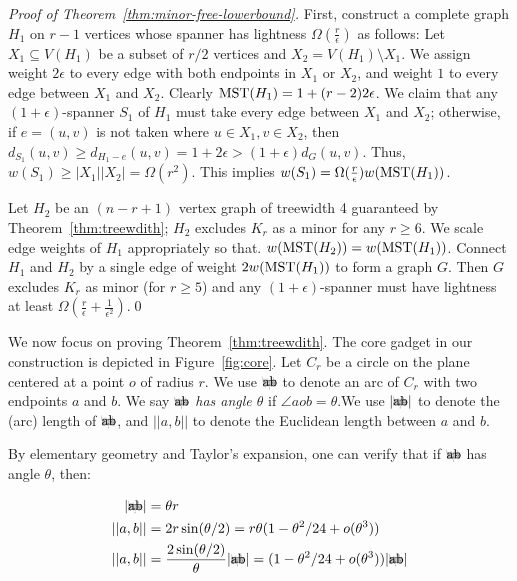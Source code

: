 \begin{proof}[Proof of Theorem~\ref{thm:minor-free-lowerbound}]
	First, construct a complete graph $H_1$ on $r-1$ vertices whose spanner has lightness $\Omega(\frac{r}{\epsilon})$ as follows: Let $X_1\subseteq V(H_1)$ be a subset of $r/2$ vertices and $X_2 = V(H_1)\setminus X_1$. We assign weight $2\epsilon$ to every edge with both endpoints in $X_1$ or $X_2$, and weight $1$ to every edge between $X_1$ and $X_2$. Clearly $\mathrm{MST}(H_1)  = 1 + (r-2)2\epsilon$. We claim that any $(1+\epsilon)$-spanner $S_1$ of $H_1$ must take every edge between $X_1$ and $X_2$; otherwise, if $e = (u,v)$ is not taken where $u\in X_1,v\in X_2$, then $d_{S_1}(u,v) \geq d_{H_1 - e}(u,v)=1+2\epsilon > (1+\epsilon)d_G(u,v)$. Thus, $w(S_1)\geq |X_1||X_2| = \Omega(r^2)$. This implies $w(S_1) = \Omega(\frac{r}{\epsilon})w(\mathrm{MST}(H_1))$.
	
	
	Let $H_2$ be an $(n-r+1)$ vertex graph of treewidth 4 guaranteed by Theorem~\ref{thm:treewdith}; $H_2$ excludes $K_r$ as a minor for any $r\geq 6$. We scale edge weights of $H_1$ appropriately so that. $w(\mathrm{MST}(H_2)) = w(\mathrm{MST}(H_1))$.  Connect $H_1$ and $H_2$ by a single edge of weight $2w(\mathrm{MST}(H_1))$ to form a graph $G$. Then $G$ excludes $K_r$ as minor (for $r\geq 5$) and any $(1+\epsilon)$-spanner must have lightness at least $\Omega(\frac{r}{\epsilon} + \frac{1}{\epsilon^2})$.\qed
\end{proof}

We now focus on proving Theorem~\ref{thm:treewdith}. The core gadget in our construction is depicted in Figure~\ref{fig:core}.  Let $C_r$ be a circle on the plane centered at a point $o$ of radius $r$. We use $\arc{ab}$ to denote an arc of $C_r$ with two endpoints $a$ and $b$. We say \emph{$\arc{ab}$ has angle $\theta$} if $\angle aob = \theta$.We use $|\arc{ab}|$ to denote the (arc) length of $\arc{ab}$, and $||a,b||$ to denote the Euclidean length between $a$ and $b$.

By elementary geometry and Taylor's expansion, one can verify that if $\arc{ab}$ has angle $\theta$, then:

\begin{equation}\label{eq:arc-chord-length}
\begin{split}
|\arc{ab}| &= \theta r \\
||a,b|| &= 2r \sin(\theta/2) = r\theta(1-\theta^2/24 + o(\theta^3)) \\
||a,b|| &= \frac{2\sin(\theta/2)}{\theta} |\arc{ab}| = (1-\theta^2/24 + o(\theta^3))|\arc{ab}|
\end{split}
\end{equation}




